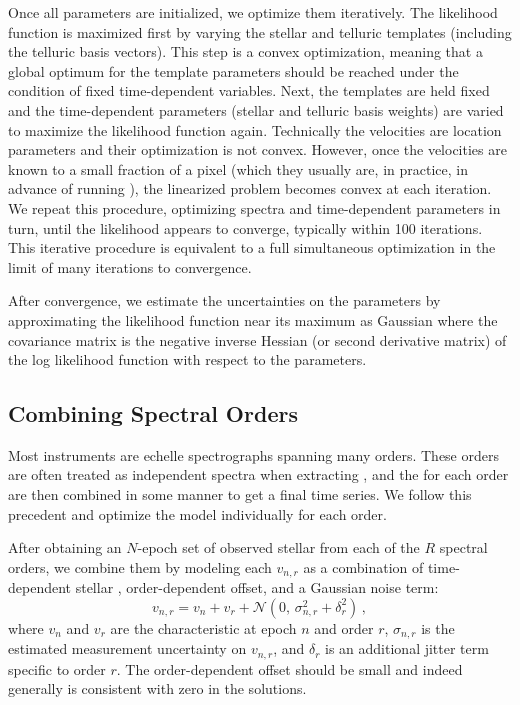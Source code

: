 \documentclass[twocolumn]{aastex62}
\begin{document}
Once all parameters are initialized, we optimize them iteratively. 
The likelihood function is maximized first by varying the stellar and telluric templates (including the telluric basis vectors). 
This step is a convex optimization, meaning that a global optimum for the template parameters should be reached under the condition of fixed time-dependent variables. 
Next, the templates are held fixed and the time-dependent parameters (stellar \RVs and telluric basis weights) are varied to maximize the likelihood function again. 
Technically the velocities are location parameters and their optimization is not convex.
However, once the velocities are known to a small fraction of a pixel (which they usually are, in practice, in advance of running \wobble), the linearized problem becomes convex at each iteration.
We repeat this procedure, optimizing spectra and time-dependent parameters in turn, until the likelihood appears to converge, typically within 100 iterations.
This iterative procedure is equivalent to a full simultaneous optimization in the limit of many iterations to convergence.

After convergence, we estimate the uncertainties on the parameters by
approximating the likelihood function near its maximum as Gaussian where the
covariance matrix is the negative inverse Hessian (or second derivative
matrix) of the log likelihood function with respect to the parameters.

\subsection{Combining Spectral Orders}
\label{s:combining-orders}

Most \EPRV instruments are echelle spectrographs spanning many orders. 
These orders are often treated as independent spectra when extracting \RVs, and the \RVs for each order are then combined in some manner to get a final time series. 
We follow this precedent and optimize the \wobble model individually for each order. 

After obtaining an $N$-epoch set of observed stellar \RVs from each of the $R$ spectral orders, we combine them by modeling each \RV $v_{n,r}$ as a combination of time-dependent stellar \RV, order-dependent \RV offset, and a Gaussian noise term:
\begin{equation}
v_{n,r} = v_n + v_r + \mathcal{N}(0,\,\sigma_{n,r}^{2} + \delta_r^2 )\,,
\end{equation}
where $v_n$ and $v_r$ are the characteristic \RVs at epoch $n$ and order $r$, $\sigma_{n,r}$ is the estimated measurement uncertainty on $v_{n,r}$, and $\delta_r$ is an additional jitter term specific to order $r$. 
The order-dependent \RV offset should be small and indeed generally is consistent with zero in the solutions.%
\end{document}
